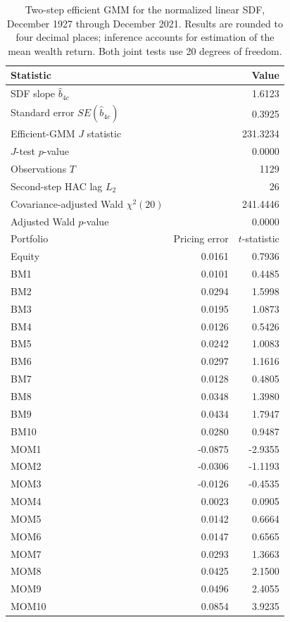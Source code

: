 \begin{table}[!htbp]
  \centering
  \small
  \caption{Two-step efficient GMM for the normalized linear SDF,
  December 1927 through December 2021.
  Results are rounded to four decimal places; inference accounts for estimation
  of the mean wealth return. Both joint tests use 20 degrees of freedom.}
  \label{tab:q4c-gmm-results}
  \begin{tabular}{lrr}
    \toprule
    Statistic & \multicolumn{2}{r}{Value} \\
    \midrule
    SDF slope $\hat b_{4c}$ & \multicolumn{2}{r}{1.6123} \\
    Standard error $SE(\hat b_{4c})$ & \multicolumn{2}{r}{0.3925} \\
    Efficient-GMM $J$ statistic & \multicolumn{2}{r}{231.3234} \\
    $J$-test $p$-value & \multicolumn{2}{r}{0.0000} \\
    Observations $T$ & \multicolumn{2}{r}{1129} \\
    Second-step HAC lag $L_2$ & \multicolumn{2}{r}{26} \\
    Covariance-adjusted Wald $\chi^2(20)$ & \multicolumn{2}{r}{241.4446} \\
    Adjusted Wald $p$-value & \multicolumn{2}{r}{0.0000} \\
    \midrule
    Portfolio & Pricing error & $t$-statistic \\
    \midrule
    Equity & 0.0161 & 0.7936 \\
    \addlinespace
    BM1 & 0.0101 & 0.4485 \\
    BM2 & 0.0294 & 1.5998 \\
    BM3 & 0.0195 & 1.0873 \\
    BM4 & 0.0126 & 0.5426 \\
    BM5 & 0.0242 & 1.0083 \\
    BM6 & 0.0297 & 1.1616 \\
    BM7 & 0.0128 & 0.4805 \\
    BM8 & 0.0348 & 1.3980 \\
    BM9 & 0.0434 & 1.7947 \\
    BM10 & 0.0280 & 0.9487 \\
    \addlinespace
    MOM1 & -0.0875 & -2.9355 \\
    MOM2 & -0.0306 & -1.1193 \\
    MOM3 & -0.0126 & -0.4535 \\
    MOM4 & 0.0023 & 0.0905 \\
    MOM5 & 0.0142 & 0.6664 \\
    MOM6 & 0.0147 & 0.6565 \\
    MOM7 & 0.0293 & 1.3663 \\
    MOM8 & 0.0425 & 2.1500 \\
    MOM9 & 0.0496 & 2.4055 \\
    MOM10 & 0.0854 & 3.9235 \\
    \bottomrule
  \end{tabular}
\end{table}
